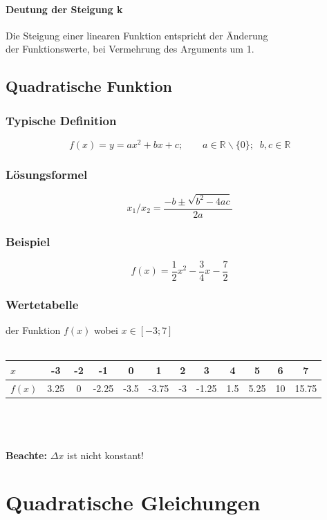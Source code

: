\documentclass[12pt,a4paper]{scrbook}
\begin{document}
\begin{center}
\fbox{\parbox{4cm}{\[\frac{\Delta y}{\Delta x} = k\]}}
\end{center}


\subsubsection{Deutung der Steigung k}
Die Steigung einer linearen Funktion entspricht der Änderung\\
der Funktionswerte, bei Vermehrung des Arguments um 1.

\section{Quadratische Funktion}
\subsection{Typische Definition}
\[f(x) = y = ax^2 + bx + c; \quad\quad a \in \mathbb{R}\backslash\{0\}; \;\; b, c \in \mathbb{R}\]
\subsection{Lösungsformel}
\[x_1 / x_2 = \frac{-b \pm \sqrt{b^2-4ac}}{2a} \]
\subsection{Beispiel}
\[f(x) = \frac{1}{2}x^2 - \frac{3}{4}x - \frac{7}{2}\]

\subsection{Wertetabelle} der Funktion $f(x)$ wobei $x \in [-3; 7]$\\\\
\begin{tabular}{l||c|c|c|c|c|c|c|c|c|c|c}
$x$ & -3 & -2 & -1 & 0 & 1 & 2 & 3 & 4 & 5 & 6 & 7\\
\hline
$f(x)$ & 3.25 & 0 & -2.25 & -3.5 & -3.75 & -3 & -1.25 & 1.5 & 5.25 & 10 & 15.75\\
\end{tabular}\\\\\\
\textbf{Beachte:} $\Delta x$ ist nicht konstant!\\


\chapter{Quadratische Gleichungen}
\label{quadratische_gleichungen}
\end{document}
